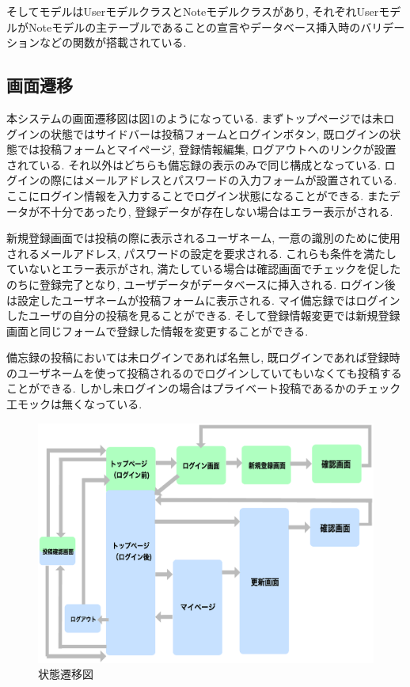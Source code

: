 \documentclass[submit,techrep]{ipsj}
\begin{document}
そしてモデルはUserモデルクラスとNoteモデルクラスがあり, それぞれUserモデルがNoteモデルの主テーブルであることの宣言やデータベース挿入時のバリデーションなどの関数が搭載されている. 

\subsection{画面遷移}
本システムの画面遷移図は図1のようになっている. まずトップページでは未ログインの状態ではサイドバーは投稿フォームとログインボタン, 既ログインの状態では投稿フォームとマイページ, 登録情報編集, ログアウトへのリンクが設置されている. それ以外はどちらも備忘録の表示のみで同じ構成となっている.
ログインの際にはメールアドレスとパスワードの入力フォームが設置されている. ここにログイン情報を入力することでログイン状態になることができる. またデータが不十分であったり, 登録データが存在しない場合はエラー表示がされる. 

新規登録画面では投稿の際に表示されるユーザネーム, 一意の識別のために使用されるメールアドレス, パスワードの設定を要求される. これらも条件を満たしていないとエラー表示がされ, 満たしている場合は確認画面でチェックを促したのちに登録完了となり, ユーザデータがデータベースに挿入される. ログイン後は設定したユーザネームが投稿フォームに表示される. マイ備忘録ではログインしたユーザの自分の投稿を見ることができる. そして登録情報変更では新規登録画面と同じフォームで登録した情報を変更することができる. 

備忘録の投稿においては未ログインであれば名無し, 既ログインであれば登録時のユーザネームを使って投稿されるのでログインしていてもいなくても投稿することができる. しかし未ログインの場合はプライベート投稿であるかのチェック工モックは無くなっている. 

\begin{figure}[h]
 \centering
 \includegraphics[scale=0.17]{systemScreen.eps}
\caption{状態遷移図}
 \label{システム}
\end{figure}
\end{document}
